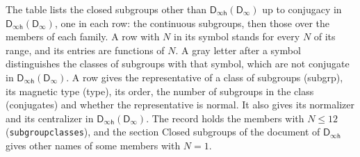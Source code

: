 \documentclass[10pt,a4paper]{article}
\numberwithin{equation}{section}
\newcommand{\grp}[1]{\mathsf{#1}}
\begin{document}
The table lists the closed subgroups other than $\grp{D_{\infty h}}(\grp{D_{\infty}})$ up to conjugacy in $\grp{D_{\infty h}}(\grp{D_{\infty}})$, one in each row: the continuous subgroups, then those over the members of each family. \label{n:index.family.N}A row with $N$ in its symbol stands for every $N$ of its range, and its entries are functions of $N$. \label{n:mark.letter}A gray letter after a symbol distinguishes the classes of subgroups with that symbol, which are not conjugate in $\grp{D_{\infty h}}(\grp{D_{\infty}})$. \label{n:head.subgroup}\label{n:head.magnetic.type}\label{n:head.order}\label{n:head.conjugates}\label{n:head.normal}A row gives the representative of a class of subgroups (subgrp), its magnetic type (type), its order, the number of subgroups in the class (conjugates) and whether the representative is normal. \label{n:head.normalizer}\label{n:head.centralizer}It also gives its normalizer and its centralizer in $\grp{D_{\infty h}}(\grp{D_{\infty}})$. The record holds the members with $N \le 12$ (\texttt{subgroupclasses}), and the section Closed subgroups of the document of \href{../../../rotation/data/pdf/Dinfh.pdf}{$\grp{D_{\infty h}}$} gives other names of some members with $N = 1$.
\end{document}
